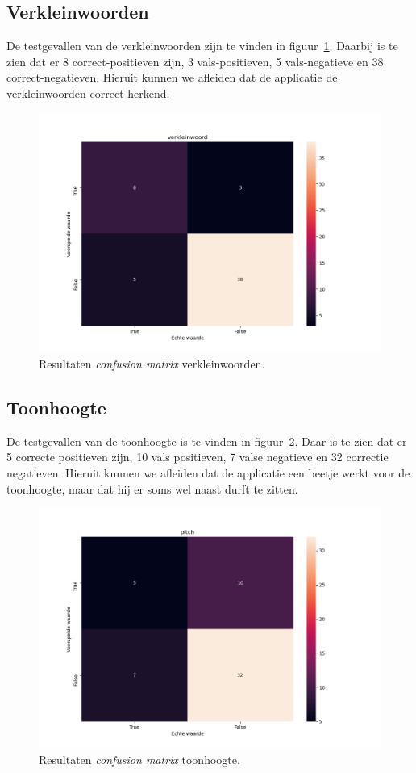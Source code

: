 \subsection{Verkleinwoorden}
De testgevallen van de verkleinwoorden zijn te vinden in figuur~\ref{fig:cfm_verkleinwoord}. Daarbij is te zien dat er 8 correct-positieven zijn, 3 vals-positieven, 5 vals-negatieve en 38 correct-negatieven.
Hieruit kunnen we afleiden dat de applicatie de verkleinwoorden correct herkend.
\begin{figure}
	\centering
	\includegraphics[width=1\textwidth]{./img/cfm_verkleinwoord}
	\caption{\label{fig:cfm_verkleinwoord} Resultaten \textit{confusion matrix} verkleinwoorden.}
\end{figure}


\subsection{Toonhoogte}
De testgevallen van de toonhoogte is te vinden in figuur~\ref{fig:cfm_pitch}. Daar is te zien dat er 5 correcte positieven zijn, 10 vals positieven, 7 valse negatieve en 32 correctie negatieven.
Hieruit kunnen we afleiden dat de applicatie een beetje werkt voor de toonhoogte, maar dat hij er soms wel naast durft te zitten.
\begin{figure}
	\centering
	\includegraphics[width=1\textwidth]{./img/cfm_pitch}
	\caption{\label{fig:cfm_pitch} Resultaten \textit{confusion matrix} toonhoogte.}
\end{figure}

